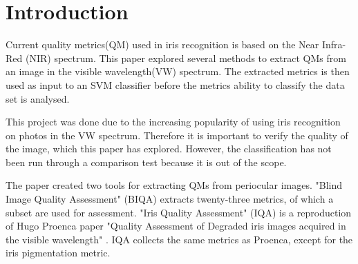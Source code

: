 \section{Introduction}
\vspace{-4mm}
Current quality metrics(QM) used in iris recognition is based on the Near
Infra-Red (NIR) spectrum.  This paper explored several methods to extract QMs
from an image in the visible wavelength(VW) spectrum. The extracted metrics is 
then used as input to an SVM classifier before the metrics ability to classify
the data set is analysed.

This project was done due to the increasing popularity of using iris recognition
on photos in the VW spectrum.  Therefore it is important to verify the quality
of the image, which this paper has explored.  However, the classification has
not been run through a comparison test because it is out of the scope.

The paper created two tools for extracting QMs from periocular images. "Blind 
Image Quality Assessment" (BIQA) \cite{biqa} extracts twenty-three metrics, of
which a subset are used for assessment.  "Iris Quality Assessment" (IQA)
\cite{iqa} is a reproduction of Hugo Proenca paper "Quality Assessment 
of Degraded iris images acquired in the visible wavelength" \cite{hugo}. IQA 
collects the same metrics as Proenca, except for the iris pigmentation metric.

